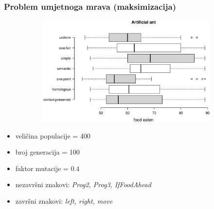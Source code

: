\documentclass{beamer}
\begin{document}
\begin{frame}
\frametitle{Problem umjetnoga mrava (maksimizacija)}


\begin{figure}[!htb]
\begin{figure}[H]
	\centering
	\includegraphics[trim=3cm 5.5cm 0cm 3.5cm, scale=0.3]{./boxPlots/ant.eps}
\end{figure}

\endminipage
{}
\endminipage
\end{figure}

\begin{itemize}
\item{veličina populacije = 400}
\item{broj generacija = 100}
\item{faktor mutacije = 0.4}
\item{nezavršni znakovi: \textit{Prog2, Prog3, IfFoodAhead}}
\item{završni znakovi: \textit{left, right, move}}
\end{itemize}
\end{frame}
\end{document}
